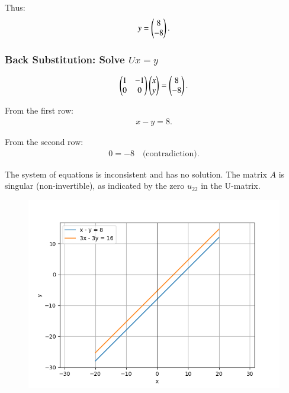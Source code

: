 \documentclass[journal,12pt,onecolumn]{IEEEtran}
\theoremstyle{remark}
\begin{document}
Thus:
\begin{align}
{y} = \begin{pmatrix}8 \\ -8\end{pmatrix}.
\end{align}

\subsubsection*{Back Substitution: Solve $Ux = y$ }
\begin{align}
\begin{pmatrix}1 & -1 \\ 0 & 0\end{pmatrix}
\begin{pmatrix}x \\ y\end{pmatrix}
=
\begin{pmatrix}8 \\ -8\end{pmatrix}.
\end{align}

From the first row:
\begin{align}
x - y = 8.
\end{align}

From the second row:
\begin{align}
0 = -8 \quad \text{(contradiction)}.
\end{align}

The system of equations is inconsistent and has no solution. The matrix $A$ is singular (non-invertible), as indicated by the zero $u_{22}$ in the U-matrix.




\begin{figure}[H]
    \centering
    \includegraphics[width=\columnwidth]{figs/fig.png}
 \end{figure}
\end{document}

